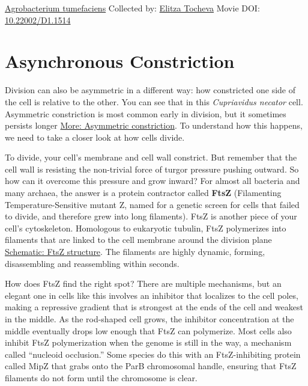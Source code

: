 \documentclass[]{tufte-book}
\begin{document}
\hypertarget{htmlwidget-ef9e6ad25578486ebcb1}{}

\label{fig:5-8}\protect\hyperlink{tree}{Agrobacterium tumefaciens} Collected by: \protect\hyperlink{elitza_tocheva}{Elitza Tocheva} Movie DOI: \href{https://doi.org/10.22002/D1.1514}{10.22002/D1.1514}

\hypertarget{asynchronous-constriction}{%
\section{Asynchronous Constriction}\label{asynchronous-constriction}}

Division can also be asymmetric in a different way: how constricted one side of the cell is relative to the other. You can see that in this \emph{Cupriavidus necator} cell. Asymmetric constriction is most common early in division, but it sometimes persists longer \protect\hyperlink{Asymmetric_constriction}{More: Asymmetric constriction}. To understand how this happens, we need to take a closer look at how cells divide.

To divide, your cell's membrane and cell wall constrict. But remember that the cell wall is resisting the non-trivial force of turgor pressure pushing outward. So how can it overcome this pressure and grow inward? For almost all bacteria and many archaea, the answer is a protein contractor called \textbf{FtsZ} (Filamenting Temperature-Sensitive mutant Z, named for a genetic screen for cells that failed to divide, and therefore grew into long filaments). FtsZ is another piece of your cell's cytoskeleton. Homologous to eukaryotic tubulin, FtsZ polymerizes into filaments that are linked to the cell membrane around the division plane \protect\hyperlink{FtsZ_structure}{Schematic: FtsZ structure}. The filaments are highly dynamic, forming, disassembling and reassembling within seconds.

How does FtsZ find the right spot? There are multiple mechanisms, but an elegant one in cells like this involves an inhibitor that localizes to the cell poles, making a repressive gradient that is strongest at the ends of the cell and weakest in the middle. As the rod-shaped cell grows, the inhibitor concentration at the middle eventually drops low enough that FtsZ can polymerize. Most cells also inhibit FtsZ polymerization when the genome is still in the way, a mechanism called ``nucleoid occlusion.'' Some species do this with an FtsZ-inhibiting protein called MipZ that grabs onto the ParB chromosomal handle, ensuring that FtsZ filaments do not form until the chromosome is clear.
\end{document}

